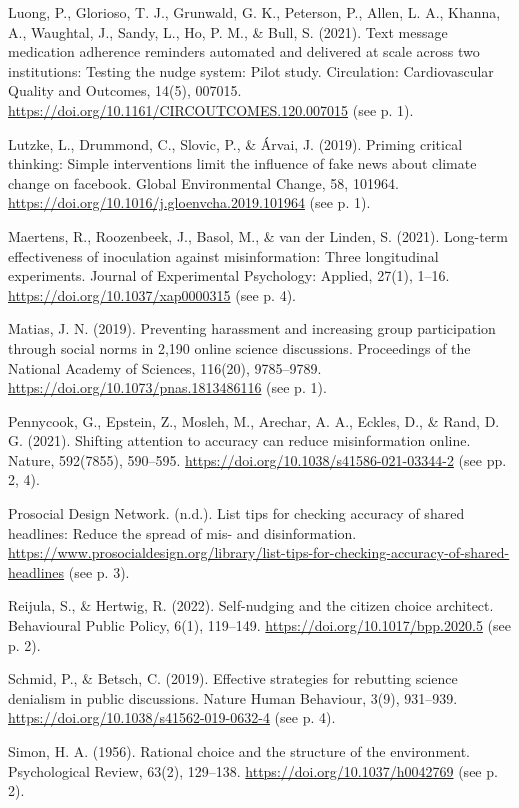 \documentclass[reflection, authordate]{jote-new-article}
\begin{document}
Luong, P., Glorioso, T. J., Grunwald, G. K., Peterson, P., Allen, L. A., Khanna, A., Waughtal, J., Sandy, L., Ho, P. M., \& Bull, S. (2021). Text message medication adherence reminders automated and delivered at scale across two institutions: Testing the nudge system: Pilot study. Circulation: Cardiovascular Quality and Outcomes, 14(5), 007015. \url{https://doi.org/10.1161/CIRCOUTCOMES.120.007015} (see p. 1).

Lutzke, L., Drummond, C., Slovic, P., \& Árvai, J. (2019). Priming critical thinking: Simple interventions limit the influence of fake news about climate change on facebook. Global Environmental Change, 58, 101964. \url{https://doi.org/10.1016/j.gloenvcha.2019.101964} (see p. 1).

Maertens, R., Roozenbeek, J., Basol, M., \& van der Linden, S. (2021). Long-term effectiveness of inoculation against misinformation: Three longitudinal experiments. Journal of Experimental Psychology: Applied, 27(1), 1–16. \url{https://doi.org/10.1037/xap0000315} (see p. 4).

Matias, J. N. (2019). Preventing harassment and increasing group participation through social norms in 2,190 online science discussions. Proceedings of the National Academy of Sciences, 116(20), 9785–9789. \url{https://doi.org/10.1073/pnas.1813486116} (see p. 1).

Pennycook, G., Epstein, Z., Mosleh, M., Arechar, A. A., Eckles, D., \& Rand, D. G. (2021). Shifting attention to accuracy can reduce misinformation online. Nature, 592(7855), 590–595. \url{https://doi.org/10.1038/s41586-021-03344-2} (see pp. 2, 4).

Prosocial Design Network. (n.d.). List tips for checking accuracy of shared headlines: Reduce the spread of mis- and disinformation. \url{https://www.prosocialdesign.org/library/list-tips-for-checking-accuracy-of-shared-headlines} (see p. 3).

Reijula, S., \& Hertwig, R. (2022). Self-nudging and the citizen choice architect. Behavioural Public Policy,
6(1), 119–149. \url{https://doi.org/10.1017/bpp.2020.5} (see p. 2).

Schmid, P., \& Betsch, C. (2019). Effective strategies for rebutting science denialism in public discussions. Nature Human Behaviour, 3(9), 931–939. \url{https://doi.org/10.1038/s41562-019-0632-4} (see p. 4).

Simon, H. A. (1956). Rational choice and the structure of the environment. Psychological Review, 63(2), 129–138. \url{https://doi.org/10.1037/h0042769} (see p. 2).
\end{document}
